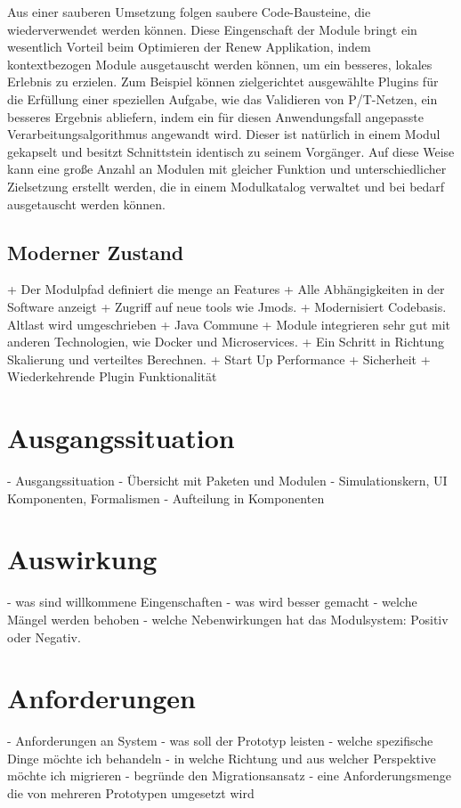 Aus einer sauberen Umsetzung folgen saubere Code-Bausteine, die wiederverwendet werden können. Diese Eingenschaft der Module bringt ein wesentlich Vorteil beim Optimieren der Renew Applikation, indem kontextbezogen Module ausgetauscht werden können, um ein besseres, lokales Erlebnis zu erzielen. Zum Beispiel können zielgerichtet ausgewählte Plugins für die Erfüllung einer speziellen Aufgabe, wie das Validieren von P/T-Netzen, ein besseres Ergebnis abliefern, indem ein für diesen Anwendungsfall angepasste Verarbeitungsalgorithmus angewandt wird. Dieser ist natürlich in einem Modul gekapselt und besitzt Schnittstein identisch zu seinem Vorgänger. Auf diese Weise kann eine große Anzahl an Modulen mit gleicher Funktion und unterschiedlicher Zielsetzung erstellt werden, die in einem Modulkatalog verwaltet und bei bedarf ausgetauscht werden können. \newpage


\subsection{Moderner Zustand} \label{sub:moderner_zustand}


+ Der Modulpfad definiert die menge an Features 
+ Alle Abhängigkeiten in der Software anzeigt 
+ Zugriff auf neue tools wie Jmods.
+ Modernisiert Codebasis. Altlast wird umgeschrieben
+ Java Commune 
+ Module integrieren sehr gut mit anderen Technologien, wie Docker und Microservices.
+ Ein Schritt in Richtung Skalierung und verteiltes Berechnen.
+ Start Up Performance
+ Sicherheit 
+ Wiederkehrende Plugin Funktionalität


\section{Ausgangssituation} \label{sec:ausgangssituation}
	- Ausgangssituation
		- Übersicht mit Paketen und Modulen 
		- Simulationskern, UI Komponenten, Formalismen   
	- Aufteilung in Komponenten 

\section{Auswirkung} \label{auswirkung}
	- was sind willkommene Eingenschaften 
	- was wird besser gemacht 
	- welche Mängel werden behoben 
	- welche Nebenwirkungen hat das Modulsystem: Positiv oder Negativ. 

\section{Anforderungen} \label{sec:anforderungen}
- Anforderungen an System 
	- was soll der Prototyp leisten 
	- welche spezifische Dinge möchte ich behandeln 
	- in welche Richtung und aus welcher Perspektive möchte ich migrieren 
	- begründe den Migrationsansatz 
	- eine Anforderungsmenge die von mehreren Prototypen umgesetzt wird 



